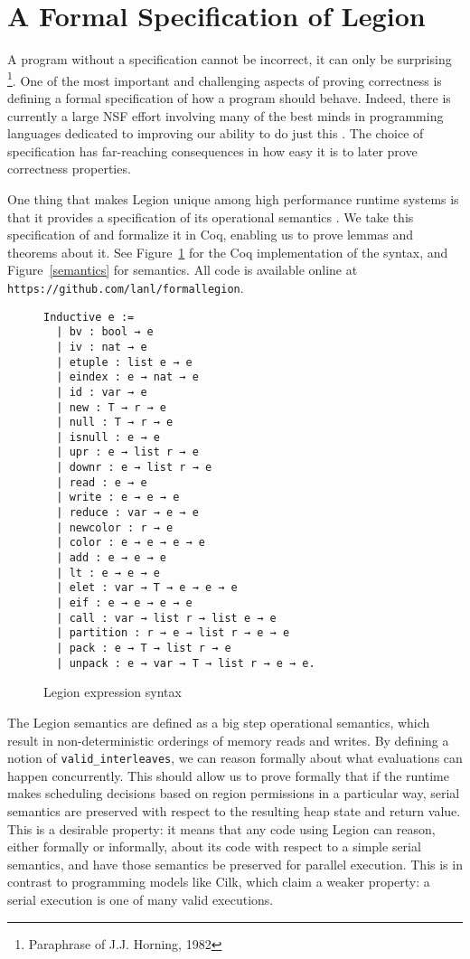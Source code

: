 \documentclass[sigconf]{acmart}
\begin{document}
\section{A Formal Specification of Legion}

A program without a specification cannot be incorrect, it can only be
surprising \footnote{Paraphrase of J.J. Horning, 1982}. One of the most
important and challenging aspects of proving correctness is defining a formal
specification of how a program should behave. Indeed, there is currently a
large NSF effort involving many of the best minds in programming languages
dedicated to improving our ability to do just this \cite{weng2016deepspec}. The choice
of specification has far-reaching consequences in how easy it is to later prove
correctness properties. 

One thing that makes Legion unique among high performance runtime systems is
that it provides a specification of its operational semantics \cite{treichler2013language}.
We take this specification of and formalize it in Coq, enabling us to prove
lemmas and theorems about it. See Figure~\ref{syntax} for the Coq
implementation of the syntax, and Figure~\ref{semantics} for semantics. All
code is available online at \texttt{https://github.com/lanl/formallegion}. 

\begin{figure}
\centering
\begin{BVerbatim}
Inductive e :=
  | bv : bool → e
  | iv : nat → e
  | etuple : list e → e
  | eindex : e → nat → e
  | id : var → e
  | new : T → r → e
  | null : T → r → e
  | isnull : e → e
  | upr : e → list r → e
  | downr : e → list r → e
  | read : e → e 
  | write : e → e → e
  | reduce : var → e → e
  | newcolor : r → e
  | color : e → e → e → e
  | add : e → e → e
  | lt : e → e → e
  | elet : var → T → e → e → e
  | eif : e → e → e → e
  | call : var → list r → list e → e
  | partition : r → e → list r → e → e
  | pack : e → T → list r → e
  | unpack : e → var → T → list r → e → e.
\end{BVerbatim}
\caption{Legion expression syntax}
\label{syntax}
\end{figure}

The Legion semantics are defined as a big step operational semantics, which
result in non-deterministic orderings of memory reads and writes. By defining a
notion of \texttt{valid\_interleaves}, we can reason formally about what evaluations 
can happen concurrently. This should allow us to prove formally that if the
runtime makes scheduling decisions based on region permissions in a particular
way, serial semantics are preserved with respect to the resulting heap state
and return value. This is a desirable property: it means that any code using
Legion can reason, either formally or informally, about its code with respect
to a simple serial semantics, and have those semantics be preserved for
parallel execution. This is in contrast to programming models like Cilk, which
claim a weaker property: a serial execution is one of many valid executions. 
\end{document}
